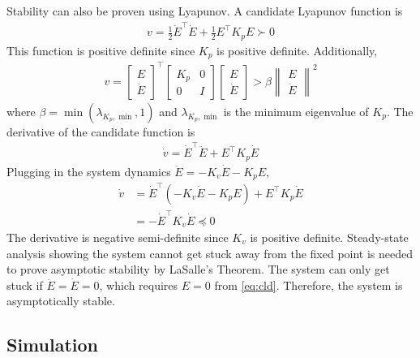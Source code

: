 \documentclass{article}
\begin{document}
Stability can also be proven using Lyapunov. A candidate Lyapunov function is
\begin{align}
  v = \frac{1}{2} \dot{E}^\top \dot{E} + \frac{1}{2} E^\top K_p E \succ 0
\end{align}
This function is positive definite since $K_p$ is positive definite. Additionally,
\begin{align}
  v = \begin{bmatrix}
    E \\
    \dot{E}
  \end{bmatrix}^\top \begin{bmatrix}
    K_p & 0 \\
    0 & I
  \end{bmatrix} \begin{bmatrix}
    E \\
    \dot{E}
  \end{bmatrix} > \beta \begin{Vmatrix}
    E \\
    \dot{E}
  \end{Vmatrix}^2
\end{align}
where $\beta = \min(\lambda_{K_p, \min}, 1)$ and $\lambda_{K_p, \min}$ is the minimum eigenvalue of $K_p$. The
derivative of the candidate function is
\begin{align}
  \dot{v} = \dot{E}^\top \ddot{E} + E^\top K_p \dot{E}
\end{align}
Plugging in the system dynamics $\ddot{E} = -K_v \dot{E} - K_p E$,
\begin{equation}
\begin{aligned}
  \dot{v} &= \dot{E}^\top (-K_v \dot{E} - K_p E) + E^\top K_p \dot{E} \\
          &= -\dot{E}^\top K_v \dot{E} \preceq 0
\end{aligned}
\end{equation}
The derivative is negative semi-definite since $K_v$ is positive definite.
Steady-state analysis showing the system cannot get stuck away from the fixed point is needed to prove asymptotic
stability by LaSalle's Theorem.
The system can only get stuck if $\ddot{E} = \dot{E} = 0$,
which requires $E = 0$ from \eqref{eq:cld}.
Therefore, the system is asymptotically stable.

\subsection{Simulation}
\end{document}
